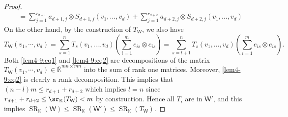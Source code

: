 \begin{proof}
\begin{align}
&= \sum_{j=1}^{r_{d+1}}a_{d+1,j} \otimes S_{d+1,j}(v_1,\dots, v_{d})
+ 
\sum_{j=1}^{r_{d+2}}a_{d+2,j} \otimes S_{d+2,j}(v_1,\dots, v_{d})
\label{lem4-9:eq1}
\end{align}
On the other hand,  by the construction of $T_{\mathsf{W}}$,  we also have 
\begin{equation}\label{lem4-9:eq2}
T_{\mathsf{W}}(v_{1},\cdots,v_{d})=
\sum_{s=1}^{n} T_{s} (v_1,\dots,  v_d)  \left( \sum_{i=1}^{m}  e_{is}\otimes e_{is} \right) = \sum_{s=l+1}^{n} T_{s} (v_1,\dots,  v_d)  \left( \sum_{i=1}^{m}  e_{is}\otimes e_{is} \right).
\end{equation}
Both \eqref{lem4-9:eq1} and \eqref{lem4-9:eq2} are decompositions of the matrix $T_{\mathsf{W}}(v_{1},\cdots,v_{d}) \in \overline{\mathbb{K}}^{mn \times mn}$ into the sum of rank one matrices.  Moreover,  \eqref{lem4-9:eq2} is clearly a rank decomposition. This implies that $(n-l)m \le r_{d+1} + r_{d+2}$ which implies $l=n$ since $r_{d+1}+r_{d+2}\le\sr_{\mathbb{K}}(T_{\mathsf{W}}) <  m$ by construction. Hence all $T_{i}$ are in $\mathsf{W}'$,  and this implies $\operatorname{SR}_{\mathbb{K}} (\mathsf{W}) \le \operatorname{SR}_{\mathbb{K}} (\mathsf{W}') \le \operatorname{SR}_{\mathbb{K}} ( T_\mathsf{W})$.
\end{proof}
